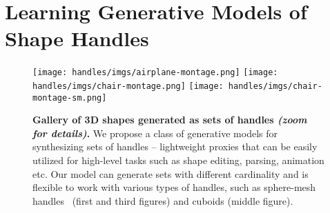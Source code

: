 \chapter{Learning Generative Models of Shape Handles}

\begin{figure}[h!]
\centering
  \texttt{[image: handles/imgs/airplane-montage.png]}
  \texttt{[image: handles/imgs/chair-montage.png]}
  \texttt{[image: handles/imgs/chair-montage-sm.png]}
  \caption{\label{fig:bunny} 
  \textbf{Gallery of 3D shapes generated as sets of handles \emph{(zoom for details)}.}
  We propose a class of generative models for synthesizing sets of handles --
  lightweight proxies that can be easily utilized for high-level tasks such as shape editing, parsing, animation etc.
  Our model can generate sets with different cardinality and is flexible to work with various types of handles, such as sphere-mesh handles~\cite{spheremesh} (first and third figures) and 
  cuboids (middle figure).
  }
 \end{figure}







